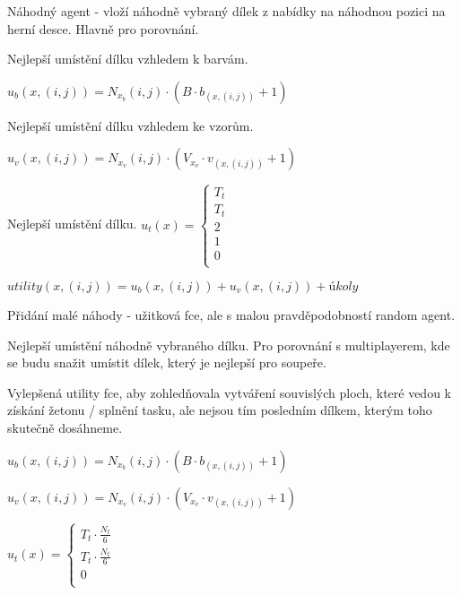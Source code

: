 Náhodný agent - vloží náhodně vybraný dílek z nabídky na náhodnou pozici na herní desce. Hlavně pro porovnání.

\vspace{10pt}

Nejlepší umístění dílku vzhledem k barvám.

$u_b(x,(i,j)) = N_{x_b}(i,j)\cdot(B\cdot b_{(x,(i,j))} + 1)$

\vspace{10pt}

Nejlepší umístění dílku vzhledem ke vzorům.

$u_v(x,(i,j)) = N_{x_v}(i,j)\cdot(V_{x_v}\cdot v_{(x,(i,j))} + 1)$

\vspace{10pt}

Nejlepší umístění dílku.
$u_t(x) = 
\begin{cases}
T_t\\
T_t\\
2\\
1\\
0\\
\end{cases}$

$utility(x,(i,j)) = u_b(x,(i,j)) + u_v(x,(i,j)) + úkoly$

\vspace{10pt}

 Přidání malé náhody - užitková fce, ale s malou pravděpodobností random agent.

\vspace{10pt}

Nejlepší umístění náhodně vybraného dílku. Pro porovnání s multiplayerem, kde se budu snažit umístit dílek, který je nejlepší pro soupeře.

\vspace{10pt}

Vylepšená utility fce, aby zohledňovala vytváření souvislých ploch, které vedou k získání žetonu / splnění tasku, ale nejsou tím posledním dílkem, kterým toho skutečně dosáhneme.

$u_b(x,(i,j)) = N_{x_b}(i,j)\cdot(B\cdot b_{(x,(i,j))} + 1)$

$u_v(x,(i,j)) = N_{x_v}(i,j)\cdot(V_{x_v}\cdot v_{(x,(i,j))} + 1)$

$u_t(x) = 
\begin{cases}
T_t\cdot\frac{N_t}{6}\\
T_t\cdot\frac{N_t}{6}\\
0\\
\end{cases}$

